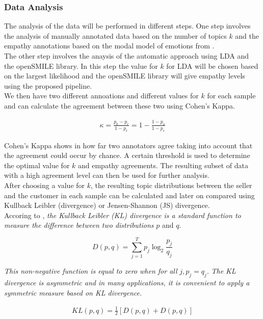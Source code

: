\documentclass[twoside]{article}
\begin{document}
\begin{multicols}{2}
\subsubsection{Data Analysis}

The analysis of the data will be performed in different steps. One step involves the analysis of manually annotated data based on the number of topics $k$ and the empathy annotations based on the modal model of emotions from \cite{Alam2017}.\\
The other step involves the anaysis of the automatic approach using LDA and the openSMILE library. In this step the value for $k$ for LDA will be chosen based on the largest likelihood and the openSMILE library will give empathy levels using the proposed pipeline.\\
We then have two different annoations and different values for $k$ for each sample and can calculate the agreement between these two using Cohen's Kappa.

\begin{align}
\kappa = \frac{p_0 - p_e}{1 - p_e} = 1 - \frac{1 - p_o}{1 - p_e}
\end{align}

Cohen's Kappa shows in how far two annotators agree taking into account that the agreement could occur by chance. A certain threshold is used to determine the optimal value for $k$ and empathy agreements. The resulting subset of data with a high agreement level can then be used for further analysis.\\

After choosing a value for $k$, the resulting topic distributions between the seller and the customer in each sample can be calculated and later on compared using Kullback Leibler (divergence) or Jensen-Shannon (JS) divergence.\\

Accoring to \cite{topicmodels2007}, \textit{the Kullback Leibler (KL) divergence is a standard function to measure the difference between two distributions} $p$ and $q$.

\begin{equation}
	D(p,q) = \sum_{j=1}^T p_j \log_2 \frac{p_j}{q_j}
\end{equation}

\textit{This non-negative function is equal to zero when for all} $j, p_j = q_j$. \textit{The KL divergence is asymmetric and in many applications, it is convenient to apply a symmetric measure based on KL divergence.}

\begin{align}
	KL(p,q) = \frac{1}{2} [ D(p,q) + D(p,q)]
\end{align}


\end{multicols}
\end{document}
